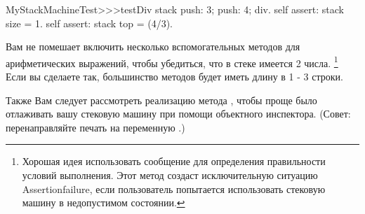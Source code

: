 \documentclass[a4paper,10pt,twoside]{book}
\begin{document}

\begin{code}{}
MyStackMachineTest>>>testDiv
	stack
		push: 3;
		push: 4;
		div.
	self assert: stack size = 1.
	self assert: stack top = (4/3).
\end{code}


Вам не помешает включить несколько вспомогательных методов для
арифметических выражений, чтобы убедиться,
что в стеке имеется 2 числа.
\footnote{Хорошая идея использовать сообщение  для
определения правильности условий выполнения.
Этот метод создаст исключительную ситуацию Assertionfailure, если
пользователь попытается использовать стековую машину в недопустимом
состоянии.}
Если вы сделаете так, большинство методов будет иметь длину в 1 - 3 строки.



Также Вам следует рассмотреть реализацию метода
, чтобы проще было отлаживать вашу
стековую машину при помощи объектного инспектора.
(Совет: перенаправляйте печать на переменную .)



\end{document}
